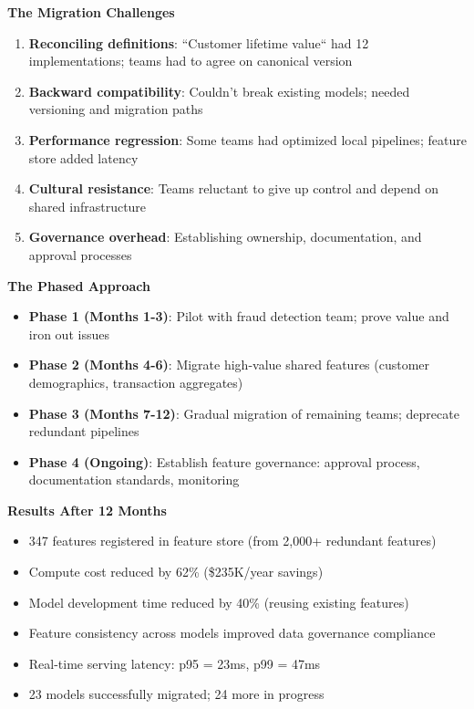 \textbf{The Migration Challenges}

\begin{enumerate}
    \item \textbf{Reconciling definitions}: ``Customer lifetime value`` had 12 implementations; teams had to agree on canonical version
    \item \textbf{Backward compatibility}: Couldn't break existing models; needed versioning and migration paths
    \item \textbf{Performance regression}: Some teams had optimized local pipelines; feature store added latency
    \item \textbf{Cultural resistance}: Teams reluctant to give up control and depend on shared infrastructure
    \item \textbf{Governance overhead}: Establishing ownership, documentation, and approval processes
\end{enumerate}

\textbf{The Phased Approach}

\begin{itemize}
    \item \textbf{Phase 1 (Months 1-3)}: Pilot with fraud detection team; prove value and iron out issues
    \item \textbf{Phase 2 (Months 4-6)}: Migrate high-value shared features (customer demographics, transaction aggregates)
    \item \textbf{Phase 3 (Months 7-12)}: Gradual migration of remaining teams; deprecate redundant pipelines
    \item \textbf{Phase 4 (Ongoing)}: Establish feature governance: approval process, documentation standards, monitoring
\end{itemize}

\textbf{Results After 12 Months}

\begin{itemize}
    \item 347 features registered in feature store (from 2,000+ redundant features)
    \item Compute cost reduced by 62\% (\$235K/year savings)
    \item Model development time reduced by 40\% (reusing existing features)
    \item Feature consistency across models improved data governance compliance
    \item Real-time serving latency: p95 = 23ms, p99 = 47ms
    \item 23 models successfully migrated; 24 more in progress
\end{itemize}

